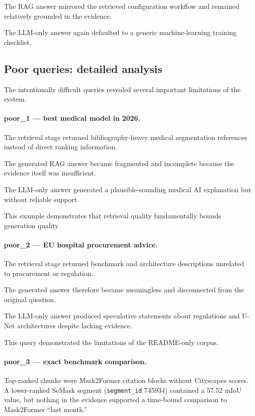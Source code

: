 \documentclass[11pt,a4paper]{article}
\begin{document}
The RAG answer mirrored the retrieved configuration workflow and remained relatively grounded in the evidence.

The LLM-only answer again defaulted to a generic machine-learning training checklist.

\subsection{Poor queries: detailed analysis}
The intentionally difficult queries revealed several important limitations of the system.

\paragraph{poor\_1 --- best medical model in 2026.}
The retrieval stage returned bibliography-heavy medical segmentation references instead of direct ranking information.

The generated RAG answer became fragmented and incomplete because the evidence itself was insufficient.

The LLM-only answer generated a plausible-sounding medical AI explanation but without reliable support.

This example demonstrates that retrieval quality fundamentally bounds generation quality.

\paragraph{poor\_2 --- EU hospital procurement advice.}
The retrieval stage returned benchmark and architecture descriptions unrelated to procurement or regulation.

The generated answer therefore became meaningless and disconnected from the original question.

The LLM-only answer produced speculative statements about regulations and U-Net architectures despite lacking evidence.

This query demonstrated the limitations of the README-only corpus.

\paragraph{poor\_3 --- exact benchmark comparison.}
Top-ranked chunks were Mask2Former citation blocks without Cityscapes scores. A lower-ranked SeMask segment (\texttt{segment\_id} 745934) contained a 57.52 mIoU value, but nothing in the evidence supported a time-bound comparison to Mask2Former ``last month.''
\end{document}

